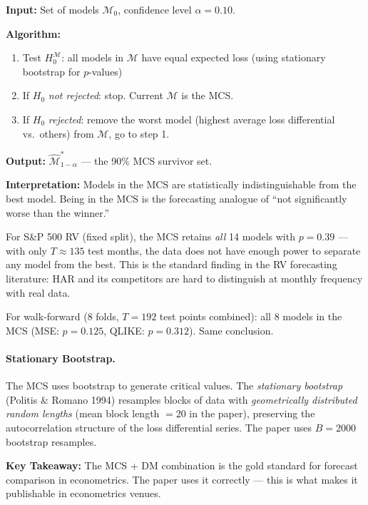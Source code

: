 \documentclass[11pt]{article}
\newcommand{\mathblock}[2]{%
  \begin{tcolorbox}[mathbox, title={Math: #1}]
  #2
  \end{tcolorbox}
}
\newcommand{\example}[2]{%
  \begin{tcolorbox}[examplebox, title={Concrete Example: #1}]
  #2
  \end{tcolorbox}
}
\newcommand{\keypoint}[1]{%
  \begin{tcolorbox}[keybox]
  \textbf{Key Takeaway:} #1
  \end{tcolorbox}
}
\begin{document}
\mathblock{MCS Algorithm}{
\textbf{Input:} Set of models $\mathcal{M}_0$, confidence level $\alpha = 0.10$.

\textbf{Algorithm:}
\begin{enumerate}
  \item Test $H_0^{\mathcal{M}}$: all models in $\mathcal{M}$ have equal
        expected loss (using stationary bootstrap for $p$-values)
  \item If $H_0$ \emph{not rejected}: stop. Current $\mathcal{M}$ is the MCS.
  \item If $H_0$ \emph{rejected}: remove the worst model
        (highest average loss differential vs.\ others) from $\mathcal{M}$,
        go to step 1.
\end{enumerate}

\textbf{Output:} $\hat{\mathcal{M}}^*_{1-\alpha}$ --- the 90\% MCS survivor set.

\textbf{Interpretation:} Models in the MCS are statistically indistinguishable
from the best model. Being in the MCS is the forecasting analogue of
``not significantly worse than the winner.''
}

\example{MCS Results in the Paper}{
For S\&P 500 RV (fixed split), the MCS retains \emph{all} 14 models with
$p = 0.39$ --- with only $T \approx 135$ test months, the data does not
have enough power to separate any model from the best. This is the
standard finding in the RV forecasting literature: HAR and its competitors
are hard to distinguish at monthly frequency with real data.

For walk-forward (8 folds, $T = 192$ test points combined): all 8 models
in the MCS (MSE: $p = 0.125$, QLIKE: $p = 0.312$). Same conclusion.
}

\paragraph{Stationary Bootstrap.}
The MCS uses bootstrap to generate critical values. The
\emph{stationary bootstrap} (Politis \& Romano 1994) resamples blocks of
data with \emph{geometrically distributed random lengths} (mean block
length $= 20$ in the paper), preserving the autocorrelation structure
of the loss differential series. The paper uses $B = 2000$ bootstrap
resamples.

\keypoint{The MCS + DM combination is the gold standard for forecast
comparison in econometrics. The paper uses it correctly --- this is
what makes it publishable in econometrics venues.}

\clearpage
\end{document}
